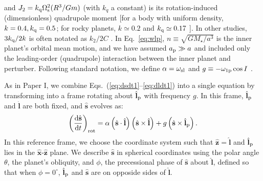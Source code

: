 \documentclass[
        fleqn,
        usenatbib,
    ]{mnras}
\newcommand*{\rd}[2]{\frac{\mathrm{d}#1}{\mathrm{d}#2}}
\newcommand*{\p}[1]{\left(#1\right)}
\newcommand*{\uv}[1]{\hat{\boldsymbol{\mathbf{#1}}}}
\begin{document}
and $J_2 = k_{\rm q}\Omega_{\rm s}^2 (R^3/Gm)$ (with $k_{q}$ a constant) is its
rotation-induced (dimensionless) quadrupole moment [for a body with uniform
density, $k=0.4, k_{\rm q}=0.5$; for rocky planets, $k\simeq 0.2$ and $k_{\rm
q}\simeq 0.17$ \citep[e.g.][]{lainey2016quantification}]. In other studies,
$3k_{\rm q} / 2 k$ is often notated as $k_2 / 2C$
\citep[e.g.][]{millholland_disk}. In Eq.~\eqref{eq:wlp}, $n \equiv
\sqrt{GM_\star/a^3}$ is the inner planet's orbital mean motion,  and we have
assumed $a_{\rm p}\gg a$ and included only the leading-order (quadrupole)
interaction between the inner planet and perturber. Following standard notation,
we define $\alpha = \omega_{\rm sl}$ and $g \equiv -\omega_{\rm 1p} \cos I$
\citep[e.g.][]{colombo1966}.

As in Paper I, we combine Eqs.~(\ref{eq:dsdt1}--\ref{eq:dldt1}) into a
single equation by transforming into a frame rotating about $\uv{l}_{\rm p}$
with frequency $g$. In this frame, $\uv{l}_{\rm p}$ and $\uv{l}$ are both fixed,
and $\uv{s}$ evolves as:
\begin{equation}
    \p{\rd{\uv{s}}{t}}_{\rm rot}
        = \alpha\p{\uv{s} \cdot \uv{l}}\p{\uv{s} \times \uv{l}}
            + g\p{\uv{s} \times \uv{l}_{\rm p}}. \label{eq:dsdt_rot}
\end{equation}
In this reference frame, we choose the coordinate system such that $\uv{z} =
\uv{l}$ and $\uv{l}_{\rm p}$ lies in the $\uv{x}$-$\uv{z}$ plane. We describe
$\uv{s}$ in spherical coordinates using the polar angle $\theta$, the planet's
obliquity, and $\phi$, the precessional phase of $\uv{s}$ about $\uv{l}$,
defined so that when $\phi = 0^\circ$, $\uv{l}_{\rm p}$ and $\uv{s}$ are on
opposide sides of $\uv{l}$.
\end{document}
